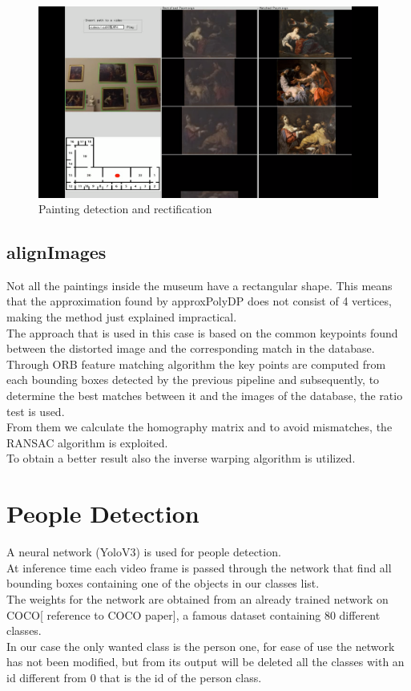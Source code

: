 \documentclass[conference]{IEEEtran}
\begin{document}
\begin{figure}[htbp]
\centerline{\includegraphics[width=0.8\columnwidth]{../detection_and_rectification/top_association_vid05.png}}
\caption{Painting detection and rectification}
\label{fig_Painting_detection_and_rectification}
\end{figure}

\subsection{alignImages}
Not all the paintings inside the museum have a rectangular shape. This means that the approximation found by approxPolyDP does not consist of 4 vertices, making the method just explained impractical.\\
The approach that is used in this case is based on the common keypoints found between the distorted image and the corresponding match in the database.\\
Through ORB feature matching algorithm the key points are computed from each bounding boxes detected by the previous pipeline and subsequently, to determine the best matches between it and the images of the database, the ratio test is used.\\
From them we calculate the homography matrix and
to avoid mismatches, the RANSAC algorithm is exploited.\\
To obtain a better result also the inverse warping algorithm is utilized.

\section{People Detection}
A neural network (YoloV3) is used for people detection.\\
At inference time each video frame is passed through the network that find all bounding boxes containing one of the objects in our classes list.\\
The weights for the network are obtained from an already trained network on COCO[ reference to COCO paper], a famous dataset containing 80 different classes.\\
In our case the only wanted class is the person one, for ease of use the network has not been modified, but from its output will be deleted all the classes with an id different from 0 that is the id of the person class.\\
\end{document}
